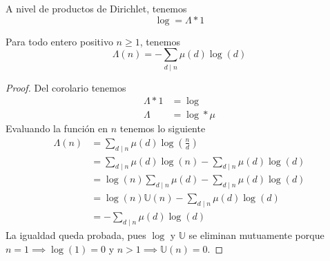 \documentclass[main.tex]{subfiles}
\begin{document}
\begin{corollary}
A nivel de productos de Dirichlet, tenemos
$$\log = \Lambda * 1$$
\end{corollary}
\begin{theorem}
Para todo entero positivo $n \geq 1$, tenemos
$$\Lambda(n) = -\sum_{d \mid n}\mu(d)\log(d)$$
\end{theorem}
\begin{proof}
Del corolario tenemos
\begin{align*}
    \Lambda * 1 &= \log\\
    \Lambda &= \log * \mu
\end{align*}
Evaluando la funci\'on en $n$ tenemos lo siguiente
\begin{align*}
    \Lambda(n) &= \sum_{d \mid n} \mu(d)\log(\frac{n}{d})\\
    &= \sum_{d \mid n} \mu(d)\log(n) - \sum_{d \mid n} \mu(d)\log(d)\\
    &= \log(n)\sum_{d \mid n} \mu(d) - \sum_{d \mid n} \mu(d)\log(d)\\
    &= \log(n)\mathbb U(n) - \sum_{d \mid n} \mu(d)\log(d)\\
    &= - \sum_{d \mid n} \mu(d)\log(d)
\end{align*}
La igualdad queda probada, pues $\log$ y $\mathbb U$ se eliminan mutuamente porque $n = 1 \implies \log(1) = 0$ y $n > 1 \implies \mathbb U(n) = 0$.
\end{proof}
\end{document}
